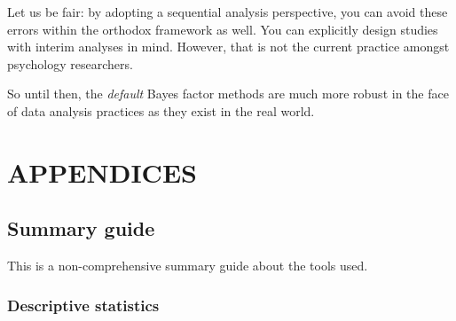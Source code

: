 \documentclass[
]{book}
\theoremstyle{definition}
\theoremstyle{definition}
\theoremstyle{definition}
\theoremstyle{definition}
\theoremstyle{remark}
\begin{document}
Let us be fair: by adopting a sequential analysis perspective, you can avoid these errors within the orthodox framework as well. You can explicitly design studies with interim analyses in mind. However, that is not the current practice amongst psychology researchers.

So until then, the \emph{default} Bayes factor methods are much more robust in the face of data analysis practices as they exist in the real world.

\hypertarget{part-appendices}{%
\part*{APPENDICES}\label{part-appendices}}

\hypertarget{summaryguide}{%
\chapter{Summary guide}\label{summaryguide}}

This is a non-comprehensive summary guide about the tools used.

\hypertarget{descriptive-statistics}{%
\section*{Descriptive statistics}\label{descriptive-statistics}}
\end{document}
